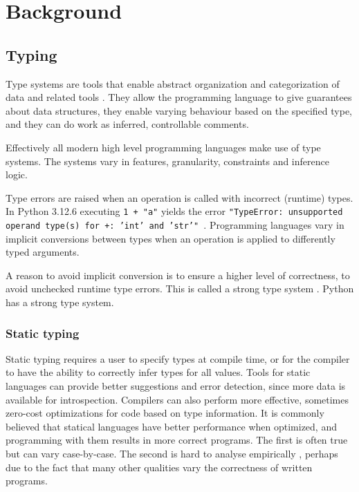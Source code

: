 \chapter{Background\label{background}}

\section{Typing}

Type systems are tools that enable abstract organization and categorization of data and related tools \cite{programming_langs}. They allow the programming language to give guarantees about data structures, they enable varying behaviour based on the specified type, and they can do work as inferred, controllable comments.

Effectively all modern high level programming languages make use of type systems. The systems vary in features, granularity, constraints and inference logic.

Type errors are raised when an operation is called with incorrect (runtime) types. In Python 3.12.6 executing {\tt 1 + "a"} yields the error {\tt "TypeError: unsupported operand type(s) for +: 'int' and 'str'" }. Programming languages vary in implicit conversions between types when an operation is applied to differently typed arguments. 

A reason to avoid implicit conversion is to ensure a higher level of correctness, to avoid unchecked runtime type errors. This is called a strong type system  \cite{cardelli_typeful_1989}. Python has a strong type system.

\subsection{Static typing}
Static typing requires a user to specify types at compile time, or for the compiler to have the ability to correctly infer types for all values. Tools for static languages can provide better suggestions and error detection, since more data is available for introspection. Compilers can also perform more effective, sometimes zero-cost optimizations for code based on type information. It is commonly believed that statical languages have better performance when optimized, and programming with them results in more correct programs. The first is often true but can vary case-by-case.  The second is hard to analyse empirically \cite{codequality_reproudction_2019}, perhaps due to the fact that  many other qualities vary the correctness of written programs. 

